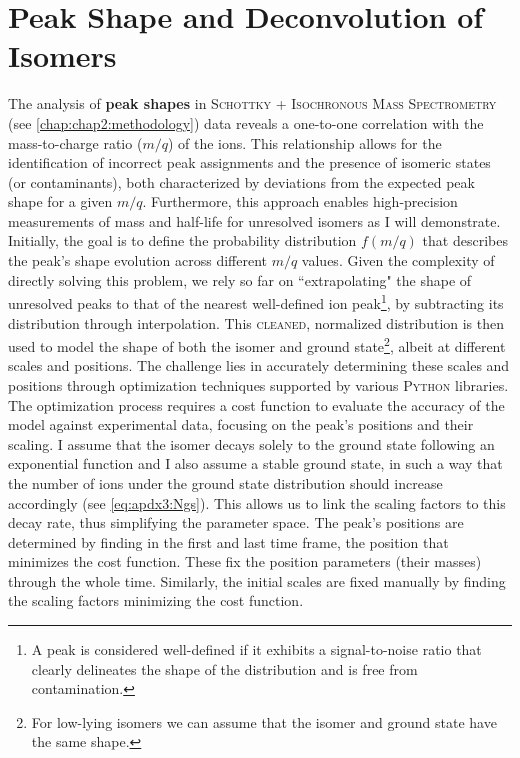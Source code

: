 
\chapter{Peak Shape and Deconvolution of Isomers}\label{apdx:peakshapedeconvolv}

The analysis of \textbf{peak shapes} in \textsc{Schottky + Isochronous Mass Spectrometry} (see \cref{chap:chap2:methodology}) data reveals a one-to-one correlation with the mass-to-charge ratio ($m/q$) of the ions. This relationship allows for the identification of incorrect peak assignments and the presence of isomeric states (or contaminants), both characterized by deviations from the expected peak shape for a given $m/q$. Furthermore, this approach enables high-precision measurements of mass and half-life for unresolved isomers as I will demonstrate.
\newpar
Initially, the goal is to define the probability distribution $f(m/q)$ that describes the peak's shape evolution across different $m/q$ values. Given the complexity of directly solving this problem, we rely so far on ``extrapolating" the shape of unresolved peaks to that of the nearest well-defined ion peak\footnote{A peak is considered well-defined if it exhibits a signal-to-noise ratio that clearly delineates the shape of the distribution and is free from contamination.}, by subtracting its distribution through interpolation. This \textsc{cleaned}, normalized distribution is then used to model the shape of both the isomer and ground state\footnote{For low-lying isomers we can assume that the isomer and ground state have the same shape.}, albeit at different scales and positions. The challenge lies in accurately determining these scales and positions through optimization techniques supported by various \textsc{Python} libraries.
\newpar
The optimization process requires a cost function to evaluate the accuracy of the model against experimental data, focusing on the peak's positions and their scaling. I assume that the isomer decays solely to the ground state following an exponential function and I also assume a stable ground state, in such a way that the number of ions under the ground state distribution should increase accordingly (see \cref{eq:apdx3:Ngs}). This allows us to link the scaling factors to this decay rate, thus simplifying the parameter space.
\newpar
The peak's positions are determined by finding in the first and last time frame, the position that minimizes the cost function. These fix the position parameters (their masses) through the whole time. Similarly, the initial scales are fixed manually by finding the scaling factors minimizing the cost function. 

